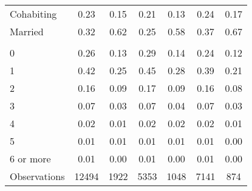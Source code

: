 \documentclass[
]{article}
\begin{document}
\begin{landscape}
\begin{table}
\begin{tabular}[t]{lcccccc}
\hspace{1em}Cohabiting & 0.23 & 0.15 & 0.21 & 0.13 & 0.24 & 0.17\\
\hspace{1em}Married & 0.32 & 0.62 & 0.25 & 0.58 & 0.37 & 0.67\\
\addlinespace[0.4em]
\multicolumn{7}{l}{\textit{Number of children}}\\
\hspace{1em}0 & 0.26 & 0.13 & 0.29 & 0.14 & 0.24 & 0.12\\
\hspace{1em}1 & 0.42 & 0.25 & 0.45 & 0.28 & 0.39 & 0.21\\
\hspace{1em}2 & 0.16 & 0.09 & 0.17 & 0.09 & 0.16 & 0.08\\
\hspace{1em}3 & 0.07 & 0.03 & 0.07 & 0.04 & 0.07 & 0.03\\
\hspace{1em}4 & 0.02 & 0.01 & 0.02 & 0.02 & 0.02 & 0.01\\
\hspace{1em}5 & 0.01 & 0.01 & 0.01 & 0.01 & 0.01 & 0.00\\
\hspace{1em}6 or more & 0.01 & 0.00 & 0.01 & 0.00 & 0.01 & 0.00\\
Observations & 12494 & 1922 & 5353 & 1048 & 7141 & 874\\
\bottomrule
\end{tabular}
\end{table}

\end{landscape}
\newpage
\end{document}
